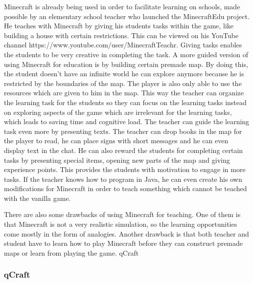 \documentclass[12pt]{report} %
\begin{document}
Minecraft is already being used in order to facilitate learning on schools, made possible by an elementary school teacher who launched the MinecraftEdu project. He teaches with Minecraft by giving his students tasks within the game, like building a house with  certain restrictions. This can be viewed on his YouTube channel https://www.youtube.com/user/MinecraftTeachr. Giving tasks enables the students to be very creative in completing the task. A more guided version of using Minecraft for education is by building certain premade map. By doing this, the student doesn't have an infinite world he can explore anymore because he is restricted by the boundaries of the map. The player is also only able to use the resources which are given to him in the map. This way the teacher can organize the learning task for the students so they can focus on the learning tasks instead on exploring aspects of the game which are irrelevant  for the learning tasks, which leads to saving time and cognitive load. The teacher can guide the learning task even more by presenting texts. The teacher can drop books in the map for the player to read, he can place signs with short messages and he can even display text in the chat. He can also reward the students for completing certain tasks by presenting special items, opening new parts of the map and giving experience points. This provides the students with motivation to engage in more tasks. If the teacher knows how to program in Java, he can even create his own modifications for Minecraft in order to teach something which cannot be teached with the vanilla game.

There are also some drawbacks of using Minecraft for teaching. One of them is that Minecraft is not a very realistic simulation, so the learning opportunities come mostly in the form of analogies. Another drawback is that both teacher and student have to learn how to play Minecraft before they can construct premade maps or learn from playing the game.
qCraft

\subsubsection{qCraft}
\end{document}
